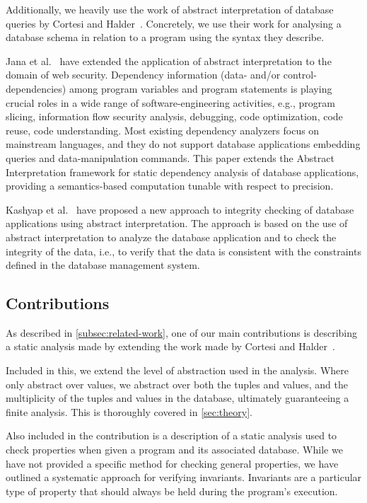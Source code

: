 Additionally, we heavily use the work of abstract interpretation of database queries by Cortesi and Halder~\cite{halder_abstract_2012}.
Concretely, we use their work for analysing a database schema in relation to a program using the syntax they describe.

Jana et al.~\cite{jana_extending_2020} have extended the application of abstract interpretation to the domain of web security.
Dependency information (data- and/or control-dependencies) among program variables and program statements is playing crucial roles in a wide range of software-engineering activities, e.g., program slicing, information flow security analysis, debugging, code optimization, code reuse, code understanding.
Most existing dependency analyzers focus on mainstream languages, and they do not support database applications embedding queries and data-manipulation commands.
This paper extends the Abstract Interpretation framework for static dependency analysis of database applications, providing a semantics-based computation tunable with respect to precision.

Kashyap et al.~\cite{kashyap_integrity_2022} have proposed a new approach to integrity checking of database applications using abstract interpretation.
The approach is based on the use of abstract interpretation to analyze the database application and to check the integrity of the data, i.e., to verify that the data is consistent with the constraints defined in the database management system.


\subsection{Contributions}\label{subsec:contributions}
As described in \autoref{subsec:related-work}, one of our main contributions is describing a static analysis made by extending the work made by Cortesi and Halder~\cite{halder_abstract_2012}.

Included in this, we extend the level of abstraction used in the analysis.
Where~\cite{halder_abstract_2012} only abstract over values, we abstract over both the tuples and values, and the multiplicity of the tuples and values in the database, ultimately guaranteeing a finite analysis.
This is thoroughly covered in \autoref{sec:theory}.

Also included in the contribution is a description of a static analysis used to check properties when given a program and its associated database.
While we have not provided a specific method for checking general properties, we have outlined a systematic approach for verifying invariants.
Invariants are a particular type of property that should always be held during the program's execution.

